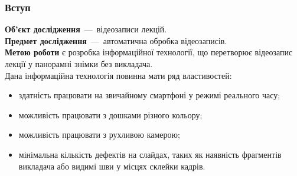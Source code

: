 \begin{frame}
    \frametitle{Вступ}
    \textbf{Об'єкт дослідження}~---~відеозаписи лекцій. \\
    \textbf{Предмет дослідження}~---~автоматична обробка відеозаписів. \\ 
    \textbf{Метою роботи} є розробка інформаційної технології, що перетворює 
    відеозапис лекції у панорамні знімки без викладача. \\

    Дана інформаційна технологія повинна мати ряд властивостей:
    \begin{itemize}
        \item здатність працювати на звичайному смартфоні у режимі реального часу;
        \item можливість працювати з дошками різного кольору;
        \item можливість працювати з рухливою камерою;
        \item мінімальна кількість дефектів на слайдах,
            таких як наявність фрагментів викладача
            або видимі шви у місцях склейки кадрів.
    \end{itemize}
\end{frame}
